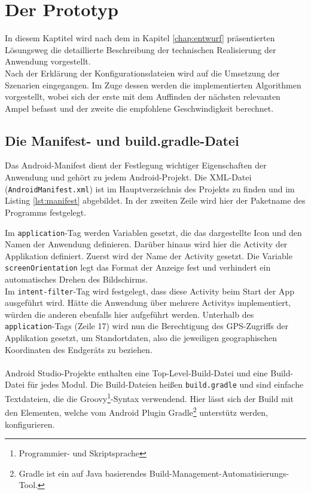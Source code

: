 \chapter{\label{chap:implementierung}Der Prototyp}
In diesem Kaptitel wird nach dem in Kapitel \ref{chap:entwurf} präsentierten Lösungsweg die detaillierte Beschreibung der technischen Realisierung der Anwendung vorgestellt.\\
Nach der Erklärung der Konfigurationsdateien wird auf die Umsetzung der Szenarien eingegangen. Im Zuge dessen werden die implementierten Algorithmen vorgestellt, wobei sich der erste mit dem Auffinden der nächsten relevanten Ampel befasst und der zweite die empfohlene Geschwindigkeit berechnet.
%
%
\section{Die Manifest- und build.gradle-Datei}
Das Android-Manifest dient der Festlegung wichtiger Eigenschaften der Anwendung und gehört zu jedem Android-Projekt. Die \gls{XML}-Datei (\texttt{AndroidManifest.xml}) ist im Hauptverzeichnis des Projekts zu finden und im Listing \ref{lst:manifest} abgebildet. In der zweiten Zeile wird hier der Paketname des Programms festgelegt. 
\begin{center}
\grayRule 
\grayRule
\end{center}
Im \texttt{application}-Tag werden Variablen gesetzt, die das dargestellte Icon und den Namen der Anwendung definieren. Darüber hinaus wird hier die \gls{Activity} der Applikation definiert. Zuerst wird der Name der \gls{Activity} gesetzt. Die Variable \texttt{screenOrientation} legt das Format der Anzeige fest und verhindert ein automatisches Drehen des Bildschirms. \\
Im \texttt{intent-filter}-Tag wird festgelegt, dass diese Activity beim Start der App ausgeführt wird. Hätte die Anwendung über mehrere \glspl{Activity} implementiert, würden die anderen ebenfalls hier aufgeführt werden.
Unterhalb des \texttt{application}-Tags (Zeile 17) wird nun die Berechtigung des \gls{GPS}-Zugriffs der Applikation gesetzt, um Standortdaten, also die jeweiligen geographischen Koordinaten des Endgeräts zu beziehen.\\\\
Android Studio-Projekte enthalten eine Top-Level-Build-Datei und eine Build-Datei für jedes Modul. Die Build-Dateien heißen \texttt{build.gradle} und sind einfache Textdateien, die die Groovy\footnote{ Programmier- und Skriptsprache}-Syntax verwendend. Hier lässt sich der Build mit den Elementen, welche vom Android Plugin Gradle\footnote{ Gradle ist ein auf Java basierendes Build-Management-Automatisierungs-Tool.} unterstütz werden, konfigurieren. \cite{android_build} \\ 
